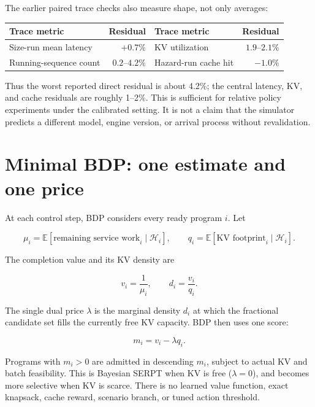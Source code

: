 \documentclass[10pt]{article}
\begin{document}
The earlier paired trace checks also measure shape, not only averages:

\begin{center}
\small
\begin{tabular}{l r@{\qquad}l r}
\toprule
Trace metric & Residual & Trace metric & Residual \\
\midrule
Size-run mean latency & $+0.7\%$ & KV utilization & $1.9$--$2.1\%$ \\
Running-sequence count & $0.2$--$4.2\%$ & Hazard-run cache hit & $-1.0\%$ \\
\bottomrule
\end{tabular}
\end{center}

Thus the worst reported direct residual is about 4.2\%; the central latency, KV, and cache residuals are roughly 1--2\%. This is sufficient for relative policy experiments under the calibrated setting. It is not a claim that the simulator predicts a different model, engine version, or arrival process without revalidation.

\clearpage
\section{Minimal BDP: one estimate and one price}

At each control step, BDP considers every ready program $i$. Let

\begin{equation}
\mu_i = \mathbb{E}[\text{remaining service work}_i\mid\mathcal H_i],
\qquad
q_i = \mathbb{E}[\text{KV footprint}_i\mid\mathcal H_i].
\end{equation}

The completion value and its KV density are

\begin{equation}
v_i=\frac{1}{\mu_i},
\qquad
d_i=\frac{v_i}{q_i}.
\end{equation}

The single dual price $\lambda$ is the marginal density $d_i$ at which the fractional candidate set fills the currently free KV capacity. BDP then uses one score:

\begin{equation}
\boxed{m_i=v_i-\lambda q_i.}
\end{equation}

Programs with $m_i>0$ are admitted in descending $m_i$, subject to actual KV and batch feasibility. This is Bayesian SERPT when KV is free ($\lambda=0$), and becomes more selective when KV is scarce. There is no learned value function, exact knapsack, cache reward, scenario branch, or tuned action threshold.
\end{document}
